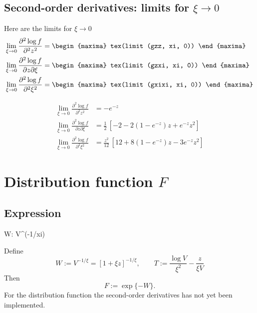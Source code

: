 \subsection{Second-order derivatives: limits for $\xi \to 0$}
Here are the limits for $\xi \to 0$
{\color{MonVertF}
  \begin{align*}
  \lim_{\xi \to 0} \frac{\partial^2 \log f}{\partial^2 z^2}
  &=
    \begin{maxima}
      tex(limit (gzz, xi, 0))
    \end{maxima}
  \\
  \lim_{\xi \to 0} \frac{\partial^2 \log f}{\partial z \partial \xi}
  &=
    \begin{maxima}
      tex(limit (gzxi, xi, 0))
    \end{maxima}
  \\
  \lim_{\xi \to 0} \frac{\partial^2 \log f}{\partial^2 \xi^2}
   &=
    \begin{maxima}
      tex(limit (gxixi, xi, 0))
    \end{maxima}
\end{align*}
}

{\color{red}
\begin{align*}
  \lim_{\xi \to 0} \frac{\partial^2 \log f}{\partial^2 z^2}
  &= -e^{-z}
  \\
  \lim_{\xi \to 0} \frac{\partial^2 \log f}{\partial z \partial \xi}
  &= \frac{1}{2} \, \left[ -2  - 2 (1 - e^{-z}) z  + e^{-z} z^2\right]  
  \\
  \lim_{\xi \to 0} \frac{\partial^2 \log f}{\partial^2 \xi^2}
   &=
    \frac{z^2}{12} \, \left[12 + 8 (1 - e^{-z}) z -3 e^{-z} z^2 \right]
\end{align*}}

\section{Distribution function $F$}

\subsection{Expression}

\begin{maxima}
  W: V^(-1/xi)
\end{maxima}

Define
$$
W := V^{-1/\xi} = [1 + \xi z]^{-1/\xi}, \qquad T := \frac{\log V}{\xi^2}
- \frac{z}{\xi V}
$$
Then
$$
 F := \exp\{ - W \}.
$$
For the distribution function the second-order derivatives has
not yet been implemented.

